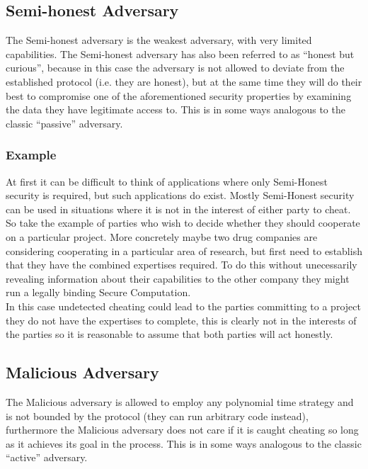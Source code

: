 \documentclass[ %
                    author={Nicholas Tutte},
                supervisor={Prof. Nigel Smart},
                    degree={MEng},
                     title={Secure Two Party Computation},
                  subtitle={A practical comparison of recent protocols},
                      type={Research - GG1K},
                      year={2015} ]{dissertation}
\begin{document}
			\subsection{Semi-honest Adversary}
				The Semi-honest adversary is the weakest adversary, with very limited capabilities. The Semi-honest adversary has also been referred to as ``honest but curious'', because in this case the adversary is not allowed to deviate from the established protocol (i.e. they are honest), but at the same time they will do their best to compromise one of the aforementioned security properties by examining the data they have legitimate access to. This is in some ways analogous to the classic ``passive'' adversary.

				\subsubsection{Example}

				At first it can be difficult to think of applications where only Semi-Honest security is required, but such applications do exist. Mostly Semi-Honest security can be used in situations where it is not in the interest of either party to cheat.\\

				So take the example of parties who wish to decide whether they should cooperate on a particular project. More concretely maybe two drug companies are considering cooperating in a particular area of research, but first need to establish that they have the combined expertises required. To do this without unecessarily revealing information about their capabilities to the other company they might run a legally binding Secure Computation.\\
				
				In this case undetected cheating could lead to the parties committing to a project they do not have the expertises to complete, this is clearly not in the interests of the parties so it is reasonable to assume that both parties will act honestly.\\

				

			\subsection{Malicious Adversary}
				The Malicious adversary is allowed to employ any polynomial time strategy and is not bounded by the protocol (they can run arbitrary code instead), furthermore the Malicious adversary does not care if it is caught cheating so long as it achieves its goal in the process. This is in some ways analogous to the classic ``active'' adversary.
\end{document}
